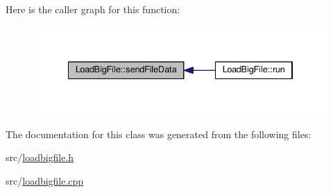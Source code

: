 Here is the caller graph for this function\+:\nopagebreak
\begin{figure}[H]
\begin{center}
\leavevmode
\includegraphics[width=334pt]{classLoadBigFile_ad0c00cd9faeeb4e03a94f530152c69d9_icgraph}
\end{center}
\end{figure}




The documentation for this class was generated from the following files\+:\begin{DoxyCompactItemize}
\item 
src/\hyperlink{loadbigfile_8h}{loadbigfile.\+h}\item 
src/\hyperlink{loadbigfile_8cpp}{loadbigfile.\+cpp}\end{DoxyCompactItemize}
